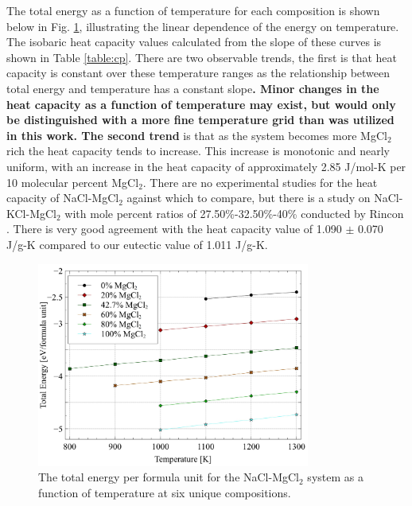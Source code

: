 \documentclass[review]{elsarticle}
\providecommand{\DIFaddtex}[1]{{\bf #1}} %
\providecommand{\DIFdeltex}[1]{} %
\providecommand{\DIFaddbegin}{\protect\color{blue}} %
\providecommand{\DIFaddend}{\protect\color{black}} %
\providecommand{\DIFdelbegin}{\protect\color{red}} %
\providecommand{\DIFdelend}{\protect\color{black}} %
\providecommand{\DIFadd}[1]{\texorpdfstring{\DIFaddtex{#1}}{#1}} %
\providecommand{\DIFdel}[1]{\texorpdfstring{\DIFdeltex{#1}}{}} %
\newcommand{\DIFscaledelfig}{0.5}
\newlength{\DIFdelgraphicswidth} %
\newlength{\DIFdelgraphicsheight} %
\newcommand{\DIFaddincludegraphics}[2][]{{\color{blue}\fbox{\DIFOincludegraphics[#1]{#2}}}} %
\newcommand{\DIFdelincludegraphics}[2][]{%
\sbox{\DIFdelgraphicsbox}{\DIFOincludegraphics[#1]{#2}}%
\settoboxwidth{\DIFdelgraphicswidth}{\DIFdelgraphicsbox} %
\settoboxtotalheight{\DIFdelgraphicsheight}{\DIFdelgraphicsbox} %
\scalebox{\DIFscaledelfig}{%
\parbox[b]{\DIFdelgraphicswidth}{\usebox{\DIFdelgraphicsbox}\\[-\baselineskip] \rule{\DIFdelgraphicswidth}{0em}}\llap{\resizebox{\DIFdelgraphicswidth}{\DIFdelgraphicsheight}{%
\setlength{\unitlength}{\DIFdelgraphicswidth}%
\begin{picture}(1,1)%
\thicklines\linethickness{2pt} %
{\color[rgb]{1,0,0}\put(0,0){\framebox(1,1){}}}%
{\color[rgb]{1,0,0}\put(0,0){\line( 1,1){1}}}%
{\color[rgb]{1,0,0}\put(0,1){\line(1,-1){1}}}%
\end{picture}%
}\hspace*{3pt}}} %
} %
\DeclareRobustCommand{\DIFaddbegin}{\DIFOaddbegin \let\includegraphics\DIFaddincludegraphics} %
\DeclareRobustCommand{\DIFaddend}{\DIFOaddend \let\includegraphics\DIFOincludegraphics} %
\DeclareRobustCommand{\DIFdelbegin}{\DIFOdelbegin \let\includegraphics\DIFdelincludegraphics} %
\DeclareRobustCommand{\DIFdelend}{\DIFOaddend \let\includegraphics\DIFOincludegraphics} %
\begin{document}
\FloatBarrier

The total energy as a function of temperature for each composition is shown below in Fig. \ref{fig:energy}, illustrating the linear dependence of the energy on temperature. The isobaric heat capacity values calculated from the slope of these curves is shown in Table \ref{table:cp}. There are two observable trends, the first is that heat capacity is constant over these temperature ranges as the relationship between total energy and temperature has a constant slope\DIFdelbegin \DIFdel{, and the second }\DIFdelend \DIFaddbegin \DIFadd{. Minor changes in the heat capacity as a function of temperature may exist, but would only be distinguished with a more fine temperature grid than was utilized in this work. The second trend }\DIFaddend is that as the system becomes more MgCl$_2$ rich the heat capacity tends to increase. This increase is monotonic and nearly uniform, with an increase in the heat capacity of approximately 2.85 J/mol-K per 10 molecular percent MgCl$_2$. There are no experimental studies for the heat capacity of NaCl-MgCl$_2$ against which to compare, but there is a study on NaCl-KCl-MgCl$_2$ with mole percent ratios of 27.50\%-32.50\%-40\% conducted by Rincon \cite{del2020experimental}. There is very good agreement with the heat capacity value of 1.090 $\pm$ 0.070 J/g-K compared to our eutectic value of 1.011 J/g-K.

\begin{figure}[h]
 \centering
 \includegraphics[width=0.8\textwidth]{images/energy.jpg} 
 \caption{The total energy per formula unit for the NaCl-MgCl$_2$ system as a function of temperature at six unique compositions.}
 \label{fig:energy}
\end{figure}
\end{document}
